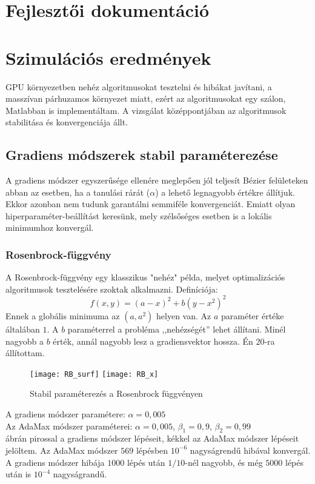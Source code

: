 \chapter{Fejlesztői dokumentáció}
\label{ch:developer}



\chapter{Szimulációs eredmények}

GPU környezetben nehéz algoritmusokat tesztelni és hibákat javítani, a masszívan párhuzamos környezet miatt, ezért az algoritmusokat egy szálon, Matlabban is implementáltam. A vizsgálat középpontjában az algoritmusok stabilitása és konvergenciája állt. 

\section{Gradiens módszerek stabil paraméterezése}

A gradiens módszer egyszerűsége ellenére meglepően jól teljesít Bézier felületeken abban az esetben, ha a tanulási rárát ($\alpha$) a lehető legnagyobb értékre állítjuk. Ekkor azonban nem tudunk garantálni semmiféle konvergenciát. Emiatt olyan hiperparaméter-beállítást keresünk, mely szélsőséges esetben is a lokális minimumhoz konvergál.

\subsection{Rosenbrock-függvény}
A Rosenbrock-függvény egy klasszikus "nehéz" példa, melyet optimalizációs algoritmusok tesztelésére szoktak alkalmazni. Definíciója:
$$ f(x,y) = (a-x)^2 + b(y-x^2)^2 $$
Ennek a globális minimuma az $(a,a^2)$ helyen van. Az $a$ paraméter értéke általában $1$. A $b$ paraméterrel a probléma ,,nehézségét'' lehet állítani. Minél nagyobb a $b$ érték, annál nagyobb lesz a gradiensvektor hossza. Én $20$-ra állítottam.
\begin{figure}[H]
	\centering
	\texttt{[image: RB\_surf]}
	\hspace{5pt}
	\texttt{[image: RB\_x]}
	\caption{Stabil paraméterezés a Rosenbrock függvényen}
	\label{fig:RB}
\end{figure}
A gradiens módszer paramétere: $\alpha = 0,005$ \\
Az AdaMax módszer paraméterei: $\alpha = 0,005$, $\beta_1 = 0,9$, $\beta_2 = 0,99$ \\
 ábrán pirossal a gradiens módszer lépéseit, kékkel az AdaMax módszer lépéseit jelöltem. Az AdaMax módszer $569$ lépésben $10^{-6}$ nagyságrendű hibával konvergál. A gradiens módszer hibája $1000$ lépés után $1/10$-nél nagyobb, és még $5000$ lépés után is $10^{-4}$ nagyságrandű.


